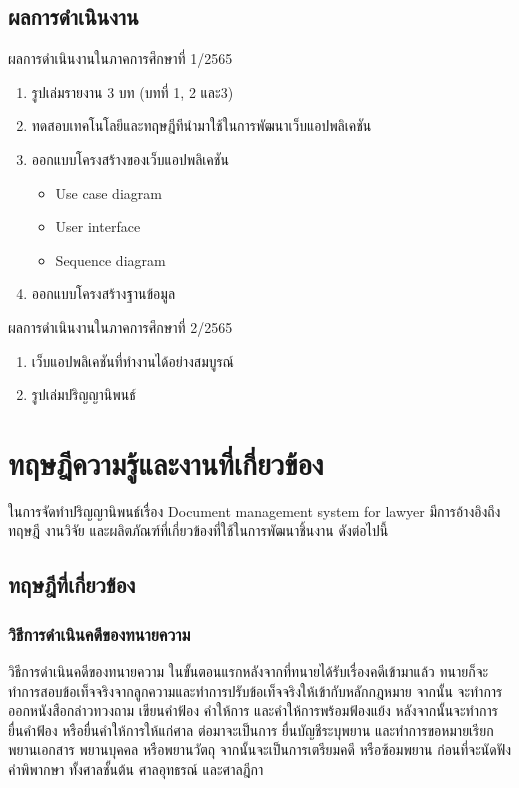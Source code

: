 \documentclass[12pt,oneside,openright,a4paper]{cpe-thai-project}
\begin{document}
\section{ผลการดำเนินงาน}
\hspace*{1cm} ผลการดำเนินงานในภาคการศึกษาที่ 1/2565
\begin{enumerate}
  \item รูปเล่มรายงาน 3 บท (บทที่ 1, 2 และ3)
  \item ทดสอบเทคโนโลยีและทฤษฎีทีนำมาใช้ในการพัฒนาเว็บแอปพลิเคชัน
  \item ออกแบบโครงสร้างของเว็บแอปพลิเคชัน
    \begin {itemize}
        \item Use case diagram
        \item User interface
        \item Sequence diagram
    \end {itemize}
  \item ออกแบบโครงสร้างฐานข้อมูล
\end{enumerate}
\hspace*{1cm} ผลการดำเนินงานในภาคการศึกษาที่ 2/2565
\begin{enumerate}
  \item เว็บแอปพลิเคชันที่ทำงานได้อย่างสมบูรณ์
  \item รูปเล่มปริญญานิพนธ์
\end{enumerate}

\chapter{ทฤษฎีความรู้และงานที่เกี่ยวข้อง}

\hspace*{1cm}ในการจัดทําปริญญานิพนธ์เรื่อง Document management system for lawyer มีการอ้างอิงถึงทฤษฎี งานวิจัย และผลิตภัณฑ์ที่เกี่ยวข้องที่ใช้ในการพัฒนาชิ้นงาน ดังต่อไปนี้

\section{ทฤษฎีที่เกี่ยวข้อง}

\subsection{วิธีการดำเนินคดีของทนายความ} 
\hspace*{1cm}วิธีการดำเนินคดีของทนายความ \cite{LawyerDefinition} ในขั้นตอนแรกหลังจากที่ทนายได้รับเรื่องคดีเข้ามาแล้ว ทนายก็จะทำการสอบข้อเท็จจริงจากลูกความและทำการปรับข้อเท็จจริงให้เข้ากับหลักกฎหมาย จากนั้น จะทำการออกหนังสือกล่าวทวงถาม เขียนคำฟ้อง คำให้การ และคำให้การพร้อมฟ้องแย้ง หลังจากนั้นจะทำการยื่นคำฟ้อง หรือยื่นคำให้การให้แก่ศาล ต่อมาจะเป็นการ ยื่นบัญชีระบุพยาน และทำการขอหมายเรียก พยานเอกสาร พยานบุคคล หรือพยานวัตถุ จากนั้นจะเป็นการเตรียมคดี หรือซ้อมพยาน ก่อนที่จะนัดฟังคำพิพากษา ทั้งศาลชั้นต้น ศาลอุทธรณ์ และศาลฎีกา 
\end{document}
